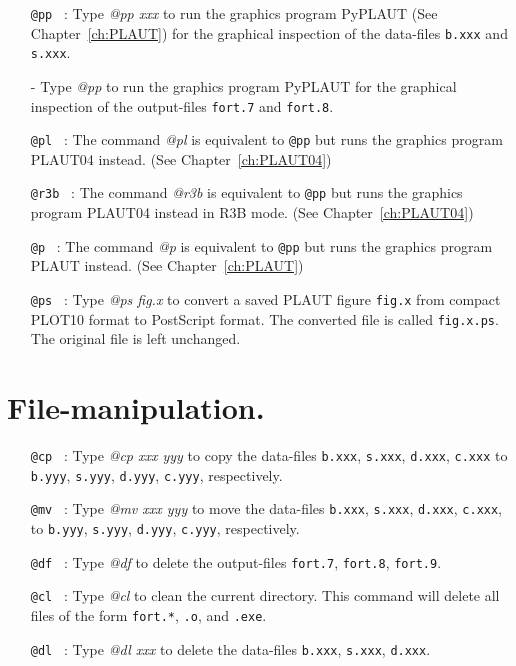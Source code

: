 \documentclass[12pt]{report}
\begin{document}
\begin{itemize}

\item[\tt @pp]~:
  Type {\it @pp xxx} to run the graphics program {\cal PyPLAUT}
  (See Chapter~\ref{ch:PLAUT})
  for the graphical inspection of the data-files 
  {\tt b.xxx} and {\tt s.xxx}. 
\item[-]
  Type {\it @pp} to run the graphics program {\cal PyPLAUT}
  for the graphical inspection of the output-files 
  {\tt fort.7} and {\tt fort.8}.

\item[\tt @pl]~:
  The command {\it @pl} is equivalent to {\tt @pp} but runs
  the graphics program {\cal PLAUT04} instead.
  (See Chapter~\ref{ch:PLAUT04})

\item[\tt @r3b]~:
  The command {\it @r3b} is equivalent to {\tt @pp} but runs
  the graphics program {\cal PLAUT04} instead in R3B mode.
  (See Chapter~\ref{ch:PLAUT04})

\item[\tt @p]~:
  The command {\it @p} is equivalent to {\tt @pp} but runs
  the graphics program {\cal PLAUT} instead.
  (See Chapter~\ref{ch:PLAUT})

\item[\tt @ps]~:
  Type {\it @ps fig.x} to convert a saved {\cal PLAUT} figure {\tt fig.x}
  from compact {\cal PLOT10} format to {\cal PostScript} format.
  The converted file is called {\tt fig.x.ps}. 
  The original file is left unchanged.

\end{itemize}

\section{ File-manipulation.} 

\begin{itemize}

\item[\tt @cp]~:
  Type {\it @cp xxx yyy} 
  to copy the data-files 
  {\tt b.xxx}, {\tt s.xxx}, {\tt d.xxx}, {\tt c.xxx} to
  {\tt b.yyy}, {\tt s.yyy}, {\tt d.yyy}, {\tt c.yyy}, respectively.

\item[\tt @mv]~:
  Type {\it @mv xxx yyy} 
  to move the data-files 
  {\tt b.xxx}, {\tt s.xxx}, {\tt d.xxx}, {\tt c.xxx}, to
  {\tt b.yyy}, {\tt s.yyy}, {\tt d.yyy}, {\tt c.yyy}, respectively.

\item[\tt @df]~:
  Type {\it @df} 
  to delete the output-files 
  {\tt fort.7}, {\tt fort.8}, {\tt fort.9}.

\item[\tt @cl]~:
  Type {\it @cl} 
  to clean the current directory.
  This command will delete  all files of the form
  {\tt fort.*}, {\tt *.o}, and {\tt *.exe}.

\item[\tt @dl]~:
  Type {\it @dl xxx} 
 to delete the data-files 
  {\tt b.xxx}, {\tt s.xxx}, {\tt d.xxx}.
\end{itemize}
\end{document}
